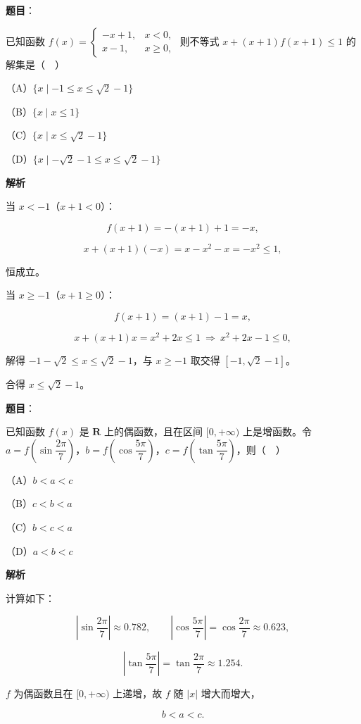 \begin{answer}

\textbf{题目}：

已知函数 $f(x)=\begin{cases}-x+1,&x<0,\\ x-1,&x\geqslant0,\end{cases}$ 则不等式 $x+(x+1)f(x+1)\leqslant1$ 的解集是（　）

（A）$\{x\mid-1\leqslant x\leqslant\sqrt2-1\}$

（B）$\{x\mid x\leqslant1\}$

（C）$\{x\mid x\leqslant\sqrt2-1\}$

（D）$\{x\mid-\sqrt2-1\leqslant x\leqslant\sqrt2-1\}$

\textbf{解析}

当 $x<-1$（$x+1<0$）：

\nopagebreak[4]
\[f(x+1)=-(x+1)+1=-x,\]

\nopagebreak[4]
\[x+(x+1)(-x)=x-x^2-x=-x^2\leqslant1,\]

恒成立。

当 $x\geqslant-1$（$x+1\geqslant0$）：

\nopagebreak[4]
\[f(x+1)=(x+1)-1=x,\]

\nopagebreak[4]
\[x+(x+1)x=x^2+2x\leqslant1\ \Longrightarrow\ x^2+2x-1\leqslant0,\]

解得 $-1-\sqrt2\leqslant x\leqslant\sqrt2-1$，与 $x\geqslant-1$ 取交得 $[-1,\sqrt2-1]$。

合得 $x\leqslant\sqrt2-1$。


\end{answer}
\begin{answer}

\textbf{题目}：

已知函数 $f(x)$ 是 $\mathbf R$ 上的偶函数，且在区间 $[0,+\infty)$ 上是增函数。令 $a=f\left(\sin\dfrac{2\pi}7\right)$，$b=f\left(\cos\dfrac{5\pi}7\right)$，$c=f\left(\tan\dfrac{5\pi}7\right)$，则（　）

（A）$b<a<c$

（B）$c<b<a$

（C）$b<c<a$

（D）$a<b<c$

\textbf{解析}

计算如下：

\nopagebreak[4]
\[\left|\sin\frac{2\pi}7\right|\approx0.782,\qquad \left|\cos\frac{5\pi}7\right|=\cos\frac{2\pi}7\approx0.623,\]

\nopagebreak[4]
\[\left|\tan\frac{5\pi}7\right|=\tan\frac{2\pi}7\approx1.254.\]

$f$ 为偶函数且在 $[0,+\infty)$ 上递增，故 $f$ 随 $|x|$ 增大而增大，

\nopagebreak[4]
\[b<a<c.\]


\end{answer}
